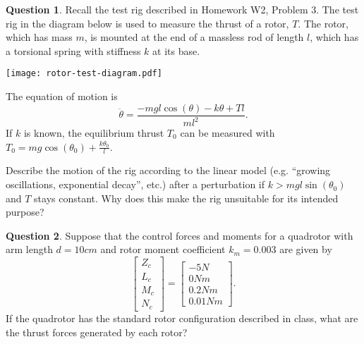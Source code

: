 \documentclass{article}
\theoremstyle{definition}
\newtheorem{question}{Question}
\begin{document}
\begin{question}
    Recall the test rig described in Homework W2, Problem 3. The test rig in the diagram below is used to measure the thrust of a rotor, $T$. The rotor, which has mass $m$, is mounted at the end of a massless rod of length $l$, which has a torsional spring with stiffness $k$ at its base.
\begin{center}
\texttt{[image: rotor-test-diagram.pdf]}
\end{center}
The equation of motion is
\begin{equation}
    \ddot{\theta} = \frac{-mgl\cos(\theta) - k\theta + Tl}{ml^2} \text{.}
\end{equation}
If $k$ is known, the equilibrium thrust $T_0$ can be measured with $T_0 = mg\cos(\theta_0) + \frac{k \theta_0}{l}$.

Describe the motion of the rig according to the linear model (e.g. ``growing oscillations, exponential decay'', etc.) after a perturbation if $k > mgl\sin(\theta_0)$ and $T$ stays constant. Why does this make the rig unsuitable for its intended purpose?

\end{question}
\vspace{0.1cm}

\clearpage 

\vspace{6cm}

\begin{question}
    Suppose that the control forces and moments for a quadrotor with arm length $d = 10cm$ and rotor moment coefficient $k_m=0.003$ are given by
\begin{equation*}
    \left[ \begin{array}{c}
        Z_c \\ L_c \\ M_c \\ N_c
    \end{array} \right] = \left[ \begin{array}{c}
        -5 N \\ 0 Nm \\ 0.2 Nm \\ 0.01 Nm
    \end{array} \right] \text{.}
\end{equation*}
    If the quadrotor has the standard rotor configuration described in class, what are the thrust forces generated by each rotor?
\end{question}

\vspace{0.1cm}
\end{document}

